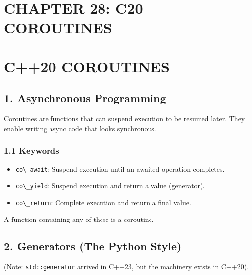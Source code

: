 \hypertarget{chapter-28-c20-coroutines}{%
\section{CHAPTER 28: C20 COROUTINES}\label{chapter-28-c20-coroutines}}

\hypertarget{c20-coroutines}{%
\section{C++20 COROUTINES}\label{c20-coroutines}}

\hypertarget{asynchronous-programming}{%
\subsection{1. Asynchronous
Programming}\label{asynchronous-programming}}

Coroutines are functions that can suspend execution to be resumed later.
They enable writing async code that looks synchronous.

\hypertarget{keywords}{%
\subsubsection{1.1 Keywords}\label{keywords}}

\begin{itemize}
\tightlist
\item
  \passthrough{\lstinline!co\_await!}: Suspend execution until an
  awaited operation completes.
\item
  \passthrough{\lstinline!co\_yield!}: Suspend execution and return a
  value (generator).
\item
  \passthrough{\lstinline!co\_return!}: Complete execution and return a
  final value.
\end{itemize}

A function containing any of these is a coroutine.

\hypertarget{generators-the-python-style}{%
\subsection{2. Generators (The Python
Style)}\label{generators-the-python-style}}

(Note: \passthrough{\lstinline!std::generator!} arrived in C++23, but
the machinery exists in C++20).

